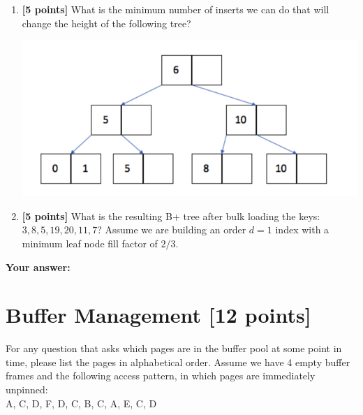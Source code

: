 \documentclass[10pt]{article}
\begin{document}
\begin{enumerate}
	\item \textbf{[5 points]}
	      What is the minimum number of inserts we can do that will change the height of the following tree?
	      \begin{center}
		      \includegraphics[scale=0.3]{5.png}
	      \end{center}

	\item \textbf{[5 points]}
	      What is the resulting B+ tree after bulk loading the keys: $3, 8, 5, 19, 20, 11, 7$?
	      Assume we are building an order $d=1$ index with a minimum leaf node fill factor of $2/3$.

\end{enumerate}
\textbf{Your answer:}
\newpage\phantom{blabla}



\newpage
\section{Buffer Management \textbf{[12 points]}}
For any question that asks which pages are in the buffer pool at some point in time, please list the pages in alphabetical order.
Assume we have 4 empty buffer frames and the following access pattern, in which pages are immediately unpinned: \\
A, C, D, F, D, C, B, C, A, E, C, D \\
\end{document}
